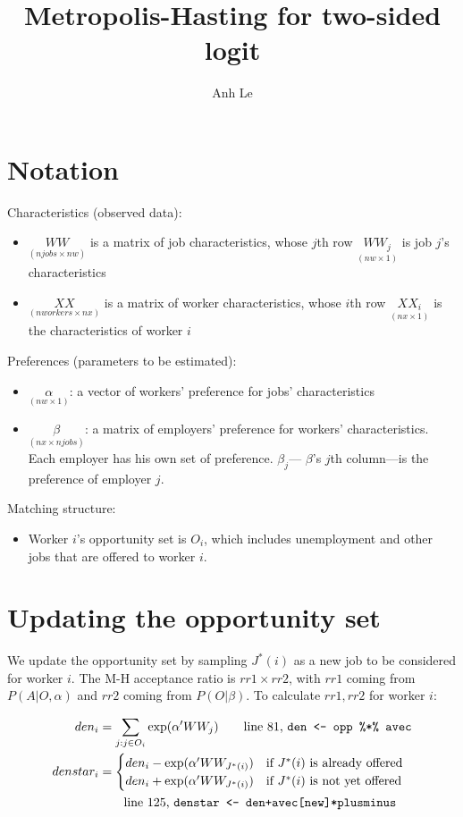 \documentclass[12pt]{article}
\title{Metropolis-Hasting for two-sided logit}
\author{Anh Le}
\begin{document}
\maketitle

\section{Notation}

Characteristics (observed data):
\begin{itemize}[noitemsep]
\item $\underset{(njobs \times nw)}{WW}$ is a matrix of job characteristics, whose $j$th row $\underset{(nw \times 1)}{WW_j}$ is job $j$'s characteristics
\item $\underset{(nworkers \times nx)}{XX}$ is a matrix of worker characteristics, whose $i$th row $\underset{(nx \times 1)}{XX_i}$ is the characteristics of worker $i$
\end{itemize}

Preferences (parameters to be estimated):
\begin{itemize}[noitemsep]
\item $\underset{(nw \times 1)}{\alpha}$: a vector of workers' preference for jobs' characteristics
\item $\underset{(nx \times njobs)}{\beta}$: a matrix of employers' preference for workers' characteristics. Each employer has his own set of preference. $\beta_j$--- $\beta$'s $j$th column---is the preference of employer $j$.
\end{itemize}

Matching structure:
\begin{itemize}
\item Worker $i$'s opportunity set is $O_i$, which includes unemployment and other jobs that are offered to worker $i$.
\end{itemize}

\section{Updating the opportunity set}

We update the opportunity set by sampling $J^*(i)$ as a new job to be considered for worker $i$. The M-H acceptance ratio is $rr1 \times rr2$, with $rr1$ coming from $P(A|O, \alpha)$ and $rr2$ coming from $P(O|\beta)$. To calculate $rr1, rr2$ for worker $i$:

\begin{align}
den_i &= \sum_{j: j \in O_i} \exp(
\alpha' WW_j) \qquad \text{line 81, \texttt{den <- opp \%*\% avec}} \\
denstar_i &= \begin{cases}
den_i - \exp(\alpha' WW_{J^*(i)}) &\text{if } J^*(i) \text{ is already offered}\\
den_i + \exp(\alpha' WW_{J^*(i)}) &\text{if } J^*(i) \text{ is not yet offered}
\end{cases} \\
& \qquad \text{line 125, \texttt{denstar <- den+avec[new]*plusminus}}
\end{align}
\end{document}
